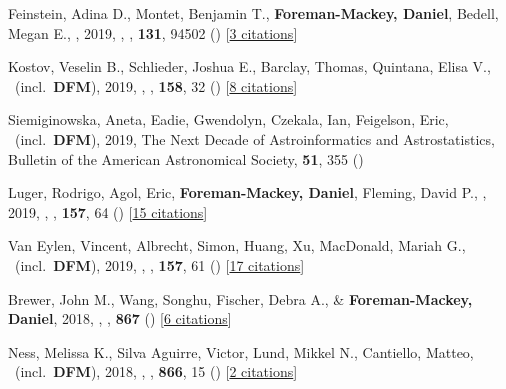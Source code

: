 \item[{\color{numcolor}\scriptsize45}] Feinstein, Adina D., Montet, Benjamin T., \textbf{Foreman-Mackey, Daniel}, Bedell, Megan E., \etal, 2019, , \pasp, \textbf{131}, 94502 () [\href{http://adsabs.harvard.edu/abs/2019PASP..131i4502F}{3 citations}]

\item[{\color{numcolor}\scriptsize44}] Kostov, Veselin B., Schlieder, Joshua E., Barclay, Thomas, Quintana, Elisa V., \etal\ (incl.\ \textbf{DFM}), 2019, , \aj, \textbf{158}, 32 () [\href{http://adsabs.harvard.edu/abs/2019AJ....158...32K}{8 citations}]

\item[{\color{numcolor}\scriptsize43}] Siemiginowska, Aneta, Eadie, Gwendolyn, Czekala, Ian, Feigelson, Eric, \etal\ (incl.\ \textbf{DFM}), 2019, The Next Decade of Astroinformatics and Astrostatistics, Bulletin of the American Astronomical Society, \textbf{51}, 355 ()

\item[{\color{numcolor}\scriptsize42}] Luger, Rodrigo, Agol, Eric, \textbf{Foreman-Mackey, Daniel}, Fleming, David P., \etal, 2019, , \aj, \textbf{157}, 64 () [\href{http://adsabs.harvard.edu/abs/2019AJ....157...64L}{15 citations}]

\item[{\color{numcolor}\scriptsize41}] Van Eylen, Vincent, Albrecht, Simon, Huang, Xu, MacDonald, Mariah G., \etal\ (incl.\ \textbf{DFM}), 2019, , \aj, \textbf{157}, 61 () [\href{http://adsabs.harvard.edu/abs/2019AJ....157...61V}{17 citations}]

\item[{\color{numcolor}\scriptsize40}] Brewer, John M., Wang, Songhu, Fischer, Debra A., \& \textbf{Foreman-Mackey, Daniel}, 2018, , \apj, \textbf{867} () [\href{http://adsabs.harvard.edu/abs/2018ApJ...867L...3B}{6 citations}]

\item[{\color{numcolor}\scriptsize39}] Ness, Melissa K., Silva Aguirre, Victor, Lund, Mikkel N., Cantiello, Matteo, \etal\ (incl.\ \textbf{DFM}), 2018, , \apj, \textbf{866}, 15 () [\href{http://adsabs.harvard.edu/abs/2018ApJ...866...15N}{2 citations}]


